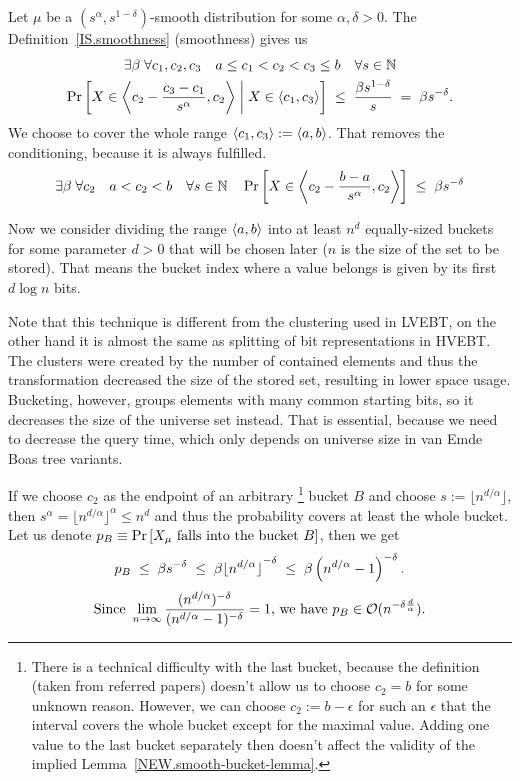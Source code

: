 



Let $\mu$ be a $(s^\alpha,s^{1-\delta})$-smooth distribution for some $\alpha,\delta > 0$. The Definition~\ref{IS.smoothness} (smoothness)  gives us
\begin{multline*}
	\exists\beta \; \forall c_1,c_2,c_3 \quad a \le c_1 < c_2 < c_3 \le b \quad \forall s \in \mathbb{N} \\
		\Pr\left[  X \in \left\langle c_2 - \frac{c_3-c_1}{s^\alpha} ,c_2\right\rangle \; \middle| \; X \in \left\langle c_1,c_3\right\rangle  \right]
		\;\le\; \frac{\beta s^{1-\delta}}{s}  \;=\;  \beta s^{-\delta}.
\end{multline*}
We choose to cover the whole range $\left\langle c_1,c_3\right\rangle := \left\langle a,b\right\rangle$. That removes the conditioning, because it is always fulfilled.
\[
	\exists\beta \; \forall c_2 \quad a < c_2 < b \quad \forall s \in \mathbb{N} \quad
		\Pr\left[  X \in \left\langle c_2 - \frac{b-a}{s^\alpha} ,c_2\right\rangle  \right]
		\;\le\; \beta s^{-\delta}
\]

Now we consider dividing the range $\left\langle a,b\right\rangle$ into at least $n^d$ equally-sized buckets for some parameter $d>0$ that will be chosen later ($n$ is the size of the set to be stored). That means the bucket index where a value belongs is given by its first $d \log n$ bits.

Note that this technique is different from the clustering used in LVEBT, on the other hand it is almost the same as splitting of bit representations in HVEBT. The clusters were created by the number of contained elements and thus the transformation decreased the size of the stored set, resulting in lower space usage.
Bucketing, however, groups elements with many common starting bits, so it decreases the size of the universe set instead. That is essential, because we need to decrease the query time, which only depends on universe size in van Emde Boas tree variants.

If we choose $c_2$ as the endpoint of an arbitrary%
	\footnote{There is a technical difficulty with the last bucket, because the definition (taken from referred papers) doesn't allow us to choose $c_2 = b$ for some unknown reason.
	However, we can choose $c_2 := b-\epsilon$ for such an $\epsilon$ that the interval covers the whole bucket except for the maximal value. Adding one value to the last bucket separately then doesn't affect the validity of the implied Lemma~\ref{NEW.smooth-bucket-lemma}.}
bucket $B$ and choose $s:= \lfloor n^{d / \alpha} \rfloor$, then
$ s^\alpha = \lfloor n^{d / \alpha} \rfloor ^\alpha \le n^d $ and thus the probability covers at least the whole bucket. Let us denote $p_B \equiv \Pr\left[ X_\mu \text{ falls into the bucket }B \right]$, then we get
\[	p_B \;\le\; \beta s^{-\delta}
	\;\le\; \beta {\lfloor n^{d / \alpha} \rfloor}^{-\delta}
	\;\le\; \beta \left( n^{d / \alpha} - 1 \right) ^{-\delta}.
\] \[
\text{Since } \lim_{n \to \infty}
	\frac{ ( n^{d / \alpha} ) ^{-\delta} }{ ( n^{d / \alpha} - 1 ) ^{-\delta} }
	= 1 \text{, we have } p_B \in \mathcal O(n^{-\delta \frac d \alpha}).
\]

